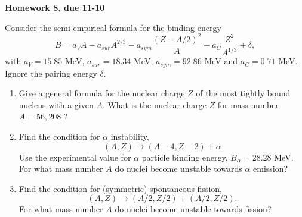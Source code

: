    
\pagestyle{plain}

\centerline{\bf\Large Homework 8, due 11-10}
\vspace*{0.5cm}

 Consider the semi-empirical formula for the 
binding energy
\[
 B = a_V A - a_{sur}A^{2/3}-a_{sym}\frac{(Z-A/2)^2}{A}
  - a_C\frac{Z^2}{A^{1/3}}\pm \delta,
\]
with $a_V=15.85$ MeV, $a_{sur}=18.34$ MeV, $a_{sym}=
92.86$ MeV and $a_C=0.71$ MeV. Ignore the pairing 
energy $\delta$.

\begin{enumerate}
\item Give a general formula for the nuclear charge 
$Z$ of the most tightly bound nucleus with a given $A$. 
What is the nuclear charge $Z$ for mass number $A=56,208$ ? 

\item Find the condition for $\alpha$ instability, 
 \[
(A,Z)\to (A-4,Z-2)+\alpha
\]
 Use the experimental value for $\alpha$ particle 
 binding energy, $B_\alpha=28.28$ MeV.
 For what mass number $A$ 
 do nuclei become unstable towards $\alpha$ emission?

\item Find the condition for (symmetric) spontaneous 
 fission, 
\[
(A,Z)\to (A/2, Z/2) + (A/2,Z/2).
\]
 For what mass
 number $A$ do nuclei become unstable towards fission?



\end{enumerate}

   
 

 


  

